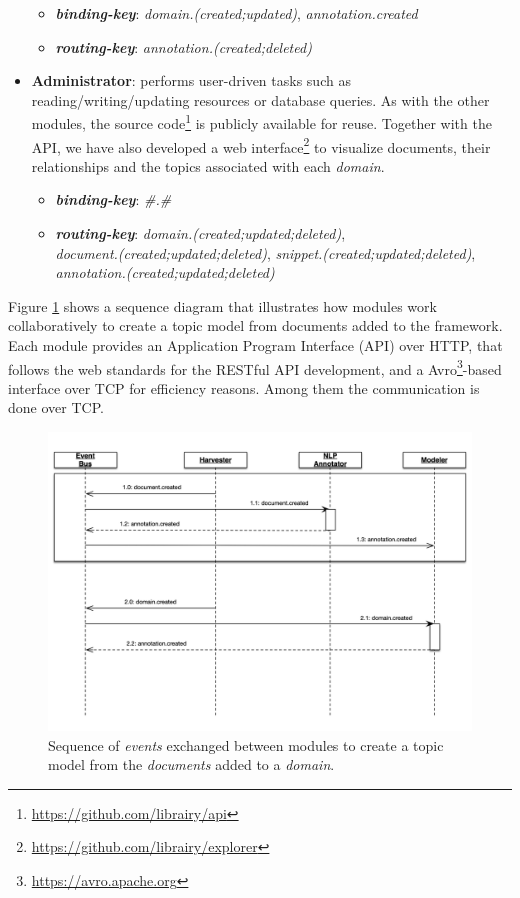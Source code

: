 \begin{itemize}
    \begin{itemize}
    	\item \textbf{\textit{binding-key}}: \textit{domain.(created;updated)}, \textit{annotation.created}
	\item \textbf{\textit{routing-key}}: \textit{annotation.(created;deleted)}	
	\end{itemize}
	\item \textbf{Administrator}: performs user-driven tasks such as reading/writing/updating resources or database queries. As with the other modules, the source code\footnote{\url{https://github.com/librairy/api}} is publicly available for reuse. Together with the API, we have also developed a web interface\footnote{\url{https://github.com/librairy/explorer}} to visualize documents, their relationships and the topics associated with each \textit{domain}. 	
    \begin{itemize}
    	\item \textbf{\textit{binding-key}}: \textit{\#.\#}
	\item \textbf{\textit{routing-key}}: \textit{domain.(created;updated;deleted)}, \\ \textit{document.(created;updated;deleted)}, \textit{snippet.(created;updated;deleted)}, \\ \textit{annotation.(created;updated;deleted)}
    \end{itemize}
\end{itemize}


Figure \ref{fig:librairy-sequence} shows a sequence diagram that illustrates how modules work collaboratively to create a topic model from documents added to the framework. Each module provides an Application Program Interface (API) over HTTP, that follows the web standards for the RESTful API development, and a Avro\footnote{\url{https://avro.apache.org}}-based interface over TCP for efficiency reasons. Among them the communication is done over TCP.  

\begin{figure} 
  \center
  \includegraphics[scale=0.45]{librairy-sequence.png}
  \caption{Sequence of \textit{events} exchanged between modules to create a topic model from the \textit{documents} added to a \textit{domain}.}
  \label{fig:librairy-sequence}
\end{figure}




